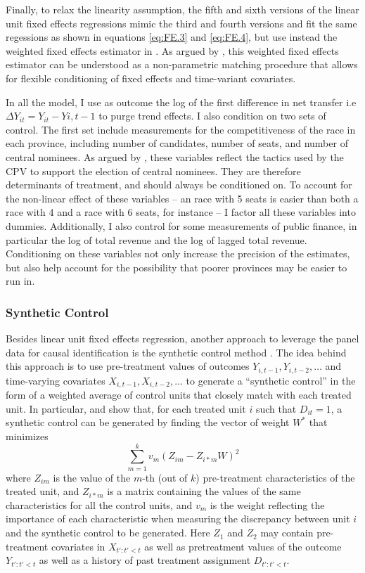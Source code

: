 \documentclass[12pt]{article}\usepackage[]{graphicx}\usepackage[]{color}
\newcommand{\1}{\mathbbm{1}}
\begin{document}
Finally, to relax the linearity assumption, the fifth and sixth versions of the linear unit fixed effects regressions mimic the third and fourth versions and fit the same regessions as shown in equations \ref{eq:FE.3} and \ref{eq:FE.4}, but use instead the weighted fixed effects estimator in \cite{ImaiKim2012}. As argued by \cite{ImaiKim2012}, this weighted fixed effects estimator can be understood as a non-parametric matching procedure that allows for flexible conditioning of fixed effects and time-variant covariates.

In all the model, I use as outcome the log of the first difference in net transfer i.e $\Delta Y_{it} = Y_{it} - Y{i, t-1}$ to purge trend effects. I also condition on two sets of control. The first set include measurements for the competitiveness of the race in each province, including number of candidates, number of seats, and number of central nominees. As argued by \cite{MaleskySchuler2011}, these variables reflect the tactics used by the CPV to support the election of central nominees. They are therefore determinants of treatment, and should always be conditioned on. To account for the non-linear effect of these variables -- an race with 5 seats is easier than both a race with 4 and a race with 6 seats, for instance -- I factor all these variables into dummies. Additionally, I also control for some measurements of public finance, in particular the log of total revenue and the log of lagged total revenue. Conditioning on these variables not only increase the precision of the estimates, but also help account for the possibility that poorer provinces may be easier to run in.

\subsubsection{Synthetic Control}
\label{sec:Synth}
Besides linear unit fixed effects regression, another approach to leverage the panel data for causal identification is the synthetic control method \citep{Abadie2010}. The idea behind this approach is to use pre-treatment values of outcomes $Y_{i,t-1},Y_{i, t-2},\dots$ and time-varying covariates $X_{i,t-1},X_{i, t-2},\dots$ to generate a ``synthetic control'' in the form of a weighted average of control units that closely match with each treated unit. In particular, \cite{Abadie2010} and \cite{Abadie2015} show that, for each treated unit $i$ such that $D_{it} =1$, a synthetic control can be generated by finding the vector of weight $W^*$ that minimizes
$$
	\sum_{m=1}^{k}v_m(Z_{im} - Z_{i*m}W)^2
$$
where $Z_{im}$ is the value of the $m$-th (out of $k$) pre-treatment characteristics of the treated unit, and $Z_{i*m}$ is a matrix containing the values of the same characteristics for all the control units, and $v_m$ is the weight reflecting the importance of each characteristic when measuring the discrepancy between unit $i$ and the synthetic control to be generated. Here $Z_1$ and $Z_2$ may contain pre-treatment covariates in $X_{t':t'<t}$ as well as pretreatment values of the outcome $Y_{t':t'<t}$ as well as a history of past treatment assignment $D_{t':t'<t}$. 
\end{document}
